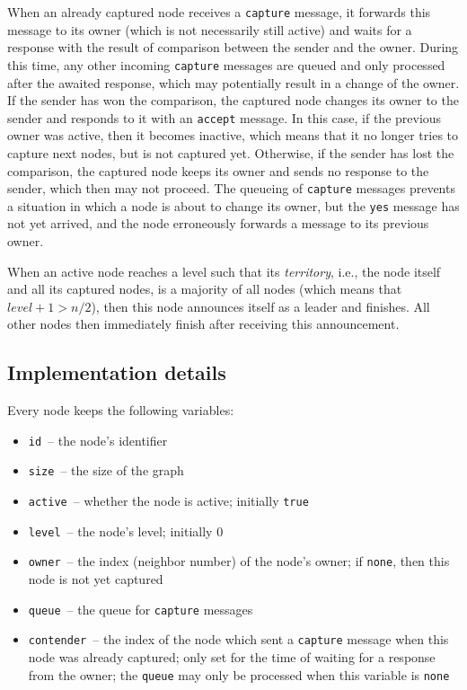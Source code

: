 \documentclass[a4paper,12pt]{article}
\newcommand{\tcapture}{\texttt{capture}\xspace}
\newcommand{\taccept}{\texttt{accept}\xspace}
\newcommand{\tyes}{\texttt{yes}\xspace}
\newcommand{\tid}{\texttt{id}\xspace}
\newcommand{\tsize}{\texttt{size}\xspace}
\newcommand{\tactive}{\texttt{active}\xspace}
\newcommand{\tlevel}{\texttt{level}\xspace}
\newcommand{\towner}{\texttt{owner}\xspace}
\newcommand{\tqueue}{\texttt{queue}\xspace}
\newcommand{\tcontender}{\texttt{contender}\xspace}
\newcommand{\tnone}{\texttt{none}\xspace}
\newcommand{\ttrue}{\texttt{true}\xspace}
\newcommand{\mlevel}{\mathit{level}}
\begin{document}
When an already captured node receives a \tcapture message,
it forwards this message to its owner (which is not necessarily still active)
and waits for a response with the result of comparison between the sender and the owner.
During this time, any other incoming \tcapture messages are queued and only processed after the awaited response,
which may potentially result in a change of the owner.
If the sender has won the comparison,
the captured node changes its owner to the sender and responds to it with an \taccept message.
In this case, if the previous owner was active, then it becomes inactive,
which means that it no longer tries to capture next nodes, but is not captured yet.
Otherwise, if the sender has lost the comparison,
the captured node keeps its owner and sends no response to the sender, which then may not proceed.
The queueing of \tcapture messages prevents a situation in which a node is about to change its owner,
but the \tyes message has not yet arrived, and the node erroneously forwards a message to its previous owner.

When an active node reaches a level such that its \emph{territory}, i.e., the node itself and all its captured nodes,
is a majority of all nodes (which means that $\mlevel + 1 > n / 2$), then this node announces itself as a leader and finishes.
All other nodes then immediately finish after receiving this announcement.

\subsection*{Implementation details}

Every node keeps the following variables:
\begin{itemize}
    \item \tid \ -- the node's identifier
    \item \tsize \ -- the size of the graph
    \item \tactive \ -- whether the node is active; initially \ttrue
    \item \tlevel \ -- the node's level; initially $0$
    \item \towner \ -- the index (neighbor number) of the node's owner;
        if \tnone, then this node is not yet captured
    \item \tqueue \ -- the queue for \tcapture messages
    \item \tcontender \ -- the index of the node which sent a \tcapture message when this node was already captured;
        only set for the time of waiting for a response from the owner;
        the \tqueue may only be processed when this variable is \tnone
\end{itemize}
\end{document}
